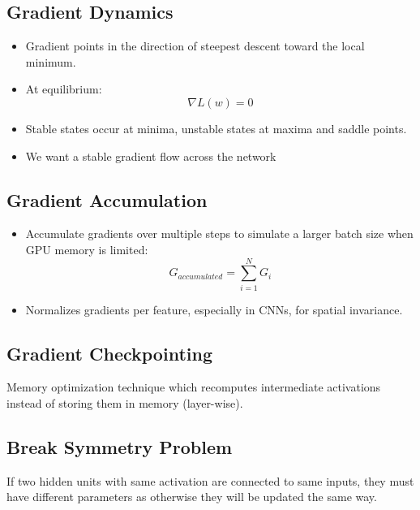 \documentclass[12pt,a4paper]{article}
\begin{document}
\subsection{Gradient Dynamics}
\begin{itemize}
    \item Gradient points in the direction of steepest descent toward the local minimum.
    \item At equilibrium:
    \[ \nabla L(w) = 0 \]
    \item Stable states occur at minima, unstable states at maxima and saddle points.
    \item We want a stable gradient flow across the network 
\end{itemize}

\subsection{Gradient Accumulation}
\begin{itemize}
    \item Accumulate gradients over multiple steps to simulate a larger batch size when GPU memory is limited:
    \[ G_{accumulated} = \sum_{i=1}^N G_i \]
    \item Normalizes gradients per feature, especially in CNNs, for spatial invariance.
\end{itemize}
\subsection{Gradient Checkpointing}
Memory optimization technique which recomputes intermediate activations instead of storing them in memory (layer-wise).
\subsection{Break Symmetry Problem}
If two hidden units with same activation are connected to same inputs, they must have different parameters as otherwise they will be updated the same way.
\end{document}
